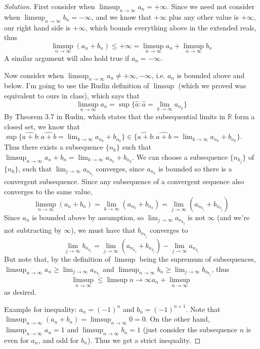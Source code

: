 \documentclass{article}
\newcommand{\R}{{\mathbb R}}
\begin{document}
\begin{proof}[Solution]\let\qed\relax
	First consider when $\limsup_{n\to\infty}a_n = +\infty$.
	Since we need not consider when $\limsup_{n \to \infty}b_n = -\infty$,
	and we know that $+\infty$ plus any other value is $+\infty$,
	our right hand side is $+\infty$,
	which bounds everything above in the extended reals,
	thus
	\[
		\limsup_{n\to\infty}(a_n + b_n) \leq +\infty =
		\limsup_{n\to\infty}a_n + \limsup_{n\to\infty}b_n
	\]
	A similar argument will also hold true if $a_n = -\infty$.

	Now consider when $\limsup_{n\to\infty} a_n \neq +\infty, -\infty$,
	i.e. $a_n$ is bounded above and below.
	I'm going to use the Rudin definition of $\limsup$
	(which we proved was equivalent to ours in class),
	which says that
	\[
		\limsup_{n\to\infty} a_n = \sup\{\hat{a} \colon
		\hat{a} = \lim_{k \to \infty} a_{n_k}\}
	\]
	By Theorem 3.7 in Rudin, which states that the subsequential limits in $\R$ form a closed set,
	we know that $\sup\{\widehat{a+b} \colon \widehat{a+b} = \lim_{k \to \infty} a_{n_k} + b_{n_k}\} \in 
	\{\widehat{a+b} \colon \widehat{a+b} = \lim_{k \to \infty} a_{n_k} + b_{n_k}\}$.
	Thus there exists a subsequence $\{n_k\}$ such that
	$\limsup_{n\to\infty} a_n + b_n = \lim_{k\to\infty} a_{n_k} + b_{n_k}$.
	We can choose a subsequence $\{n_{k_j}\}$ of $\{n_k\}$,
	such that $\lim_{j\to\infty}a_{n_{k_j}}$ converges,
	since $a_{n_k}$ is bounded so there is a convergent subsequence.
	Since any subsequence of a convergent sequence also converges
	to the same value,
	\[
		\limsup_{n\to\infty} (a_n + b_n) = \lim_{k \to \infty} (a_{n_k} + b_{n_k}) =
		\lim_{j\to\infty} (a_{n_{k_j}} + b_{n_{k_j}})
	\]
	Since $a_n$ is bounded above by assumption,
	so $\lim_{j\to\infty}a_{n_{k_j}}$ is not $\infty$ (and we're not subtracting by $\infty$),
	we must have that $b_{n_{k_j}}$ converges to
	\[
		\lim_{j\to\infty}b_{n_{k_j}} = \lim_{j\to\infty} (a_{n_{k_j}} + b_{n_{k_j}}) - \lim_{j\to\infty}a_{n_{k_j}}
	\]
	But note that, by the definition of $\limsup$ being the supremum of subsequences,
	$\limsup_{n\to\infty}a_n \geq \lim_{j\to\infty}a_{n_{k_j}}$
	and $\limsup_{n\to\infty}b_n \geq \lim_{j\to\infty}b_{n_{k_j}}$,
	thus
	\[
		\limsup_{n\to\infty} \leq \limsup{n\to\infty} a_n + \limsup_{n\to\infty}
	\]
	as desired.

	Example for inequality: $a_n = (-1)^n$ and $b_n = (-1)^{n+1}$.
	Note that $\limsup_{n\to\infty} (a_n + b_n) = \limsup_{n\to\infty} 0 = 0$.
	On the other hand, $\limsup_{n\to\infty} a_n = 1$ and $\limsup_{n\to\infty} b_n = 1$
	(just consider the subsequence $n$ is even for $a_n$, and odd for $b_n$).
	Thus we get a strict inequality.
\end{proof}
\clearpage
~\clearpage
\end{document}
